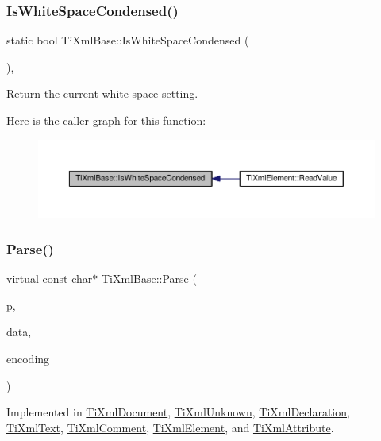 \subsubsection{\texorpdfstring{Is\+White\+Space\+Condensed()}{IsWhiteSpaceCondensed()}}
{\footnotesize\ttfamily static bool Ti\+Xml\+Base\+::\+Is\+White\+Space\+Condensed (\begin{DoxyParamCaption}{ }\end{DoxyParamCaption})\hspace{0.3cm}{\ttfamily [inline]}, {\ttfamily [static]}}



Return the current white space setting. 

Here is the caller graph for this function\+:\nopagebreak
\begin{figure}[H]
\begin{center}
\leavevmode
\includegraphics[width=350pt]{class_ti_xml_base_ad4b1472531c647a25b1840a87ae42438_icgraph}
\end{center}
\end{figure}
\mbox{\label{class_ti_xml_base_a00e4edb0219d00a1379c856e5a1d2025}} 
\subsubsection{\texorpdfstring{Parse()}{Parse()}}
{\footnotesize\ttfamily virtual const char$\ast$ Ti\+Xml\+Base\+::\+Parse (\begin{DoxyParamCaption}\item[{const char $\ast$}]{p,  }\item[{\hyperlink{class_ti_xml_parsing_data}{Ti\+Xml\+Parsing\+Data} $\ast$}]{data,  }\item[{\hyperlink{tinyxml_8h_a88d51847a13ee0f4b4d320d03d2c4d96}{Ti\+Xml\+Encoding}}]{encoding }\end{DoxyParamCaption})\hspace{0.3cm}{\ttfamily [pure virtual]}}



Implemented in \hyperlink{class_ti_xml_document_a789ad2f06f93d52bdb5570b2f3670289}{Ti\+Xml\+Document}, \hyperlink{class_ti_xml_unknown_aa51c2694e4177b5f0b5429ee5a81b58d}{Ti\+Xml\+Unknown}, \hyperlink{class_ti_xml_declaration_a9839ea97ed687a2b7342fd7b0f04361b}{Ti\+Xml\+Declaration}, \hyperlink{class_ti_xml_text_a8d2dcfa41fc73d3e62dacc2fcf633819}{Ti\+Xml\+Text}, \hyperlink{class_ti_xml_comment_a43bddc18ac057734b41d84653b71d3e0}{Ti\+Xml\+Comment}, \hyperlink{class_ti_xml_element_af95c9165159fd9dfdcc5b894a3fcf85b}{Ti\+Xml\+Element}, and \hyperlink{class_ti_xml_attribute_ad62774421b814894b995af3b5d231dda}{Ti\+Xml\+Attribute}.

